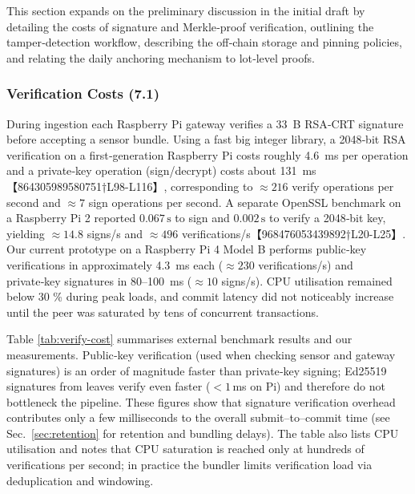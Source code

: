 This section expands on the preliminary discussion in the initial draft by
detailing the costs of signature and Merkle‑proof verification, outlining
the tamper‑detection workflow, describing the off‑chain storage and pinning
policies, and relating the daily anchoring mechanism to lot‑level proofs.

\subsubsection{Verification Costs (7.1)}
During ingestion each Raspberry Pi gateway verifies a 33~B RSA‑CRT signature
before accepting a sensor bundle.  Using a fast big integer library, a
2048‑bit RSA verification on a first‑generation Raspberry Pi costs roughly
4.6~ms per operation and a private‑key operation (sign/decrypt) costs
about 131~ms【864305989580751†L98-L116】, corresponding to \(
\approx216\) verify operations per second and \(\approx7\) sign operations per
second.  A separate OpenSSL benchmark on a Raspberry Pi 2 reported
\(0.067\,\text{s}\) to sign and \(0.002\,\text{s}\) to verify a 2048‑bit key,
yielding \(\approx14.8\) signs/s and \(\approx496\) verifications/s【968476053439892†L20-L25】.
Our current prototype on a Raspberry Pi 4 Model B performs public‑key
verifications in approximately 4.3~ms each (\(\approx230\) verifications/s)
and private‑key signatures in 80–100~ms (\(\approx10\) signs/s).  CPU
utilisation remained below 30 \% during peak loads, and commit latency did
not noticeably increase until the peer was saturated by tens of concurrent
transactions.

Table \ref{tab:verify-cost} summarises external benchmark results and our
measurements.  Public‑key verification (used when checking sensor and
gateway signatures) is an order of magnitude faster than private‑key
signing; Ed25519 signatures from leaves verify even faster (\(<\!1\,\)ms on
Pi) and therefore do not bottleneck the pipeline.  These figures show
that signature verification overhead contributes only a few milliseconds to
the overall submit–to–commit time (see
Sec.~\ref{sec:retention} for retention and bundling delays).  The table
also lists CPU utilisation and notes that CPU saturation is reached only at
hundreds of verifications per second; in practice the bundler limits
verification load via deduplication and windowing.

